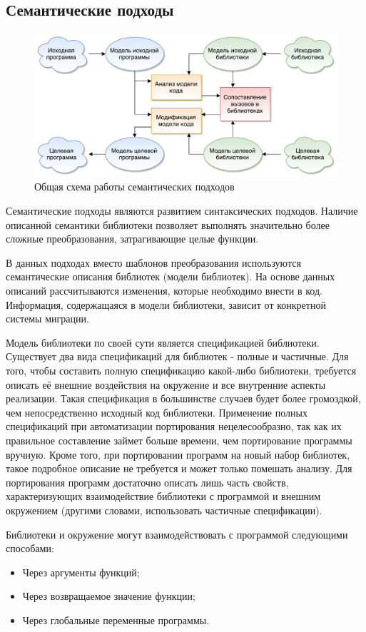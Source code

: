 \subsection{Семантические подходы}
\begin{figure}[htbp]
	\centering
	\includegraphics[width=\textwidth]{scheme.pdf}
	\caption{Общая схема работы семантических подходов}
\end{figure}

Семантические подходы являются развитием синтаксических подходов. Наличие описанной семантики библиотеки позволяет выполнять значительно более сложные преобразования, затрагивающие целые функции.

В данных подходах вместо шаблонов преобразования используются семантические описания библиотек (модели библиотек). На основе данных описаний рассчитываются изменения, которые необходимо внести в код. Информация, содержащаяся в модели библиотеки, зависит от конкретной системы миграции.

Модель библиотеки по своей сути является спецификацией библиотеки. Существует два вида спецификаций для библиотек - полные и частичные. Для того, чтобы составить полную спецификацию какой-либо библиотеки, требуется описать её внешние воздействия на окружение и все внутренние аспекты реализации. Такая спецификация в большинстве случаев будет более громоздкой, чем непосредственно исходный код библиотеки. Применение полных спецификаций при автоматизации портирования нецелесообразно, так как их правильное составление займет больше времени, чем портирование программы вручную. Кроме того, при портировании программ на новый набор библиотек, такое подробное описание не требуется и может только помешать анализу. Для портирования программ достаточно описать лишь часть свойств, характеризующих взаимодействие библиотеки с программой и внешним окружением (другими словами, использовать частичные спецификации).

Библиотеки и окружение могут взаимодействовать с программой следующими  способами:
\begin{itemize}
	\item Через аргументы функций;
	\item Через возвращаемое значение функции;
	\item Через глобальные переменные программы.
\end{itemize}

